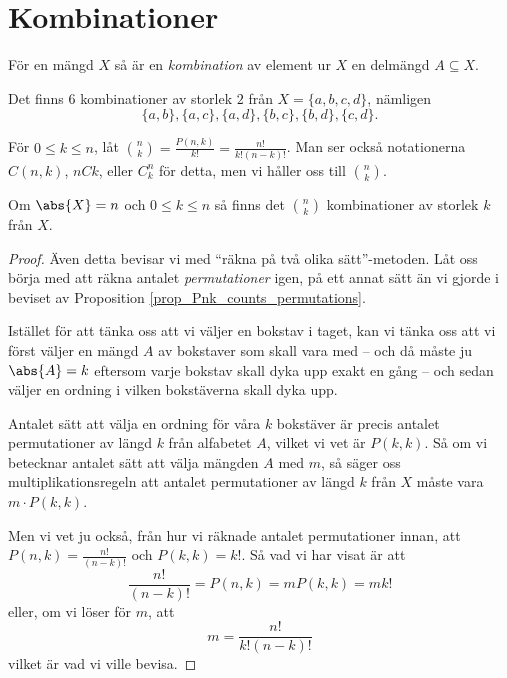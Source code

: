 \documentclass{tufte-handout}
\begin{document}
\section{Kombinationer}

\begin{definition}
	För en mängd $X$ så är en \emph{kombination} av element ur $X$ en delmängd $A \subseteq X$.
\end{definition}

\begin{example}
	Det finns $6$ kombinationer av storlek $2$ från $X = \{a,b,c,d\}$, nämligen
	$$\{a,b\}, \{a,c\},\{a,d\},\{b,c\},\{b,d\},\{c,d\}.$$
\end{example}

\begin{definition}
	För $0 \leq k \leq n$, låt $\binom{n}{k} = \frac{P(n,k)}{k!} = \frac{n!}{k!(n-k)!}$. Man ser också notationerna $C(n,k)$, $nCk$, eller $C^n_k$ för detta, men vi håller oss till $\binom{n}{k}$. 
\end{definition}

\begin{proposition}
	Om $\abs{X} = n$ och $0 \leq k \leq n$ så finns det $\binom{n}{k}$ kombinationer av storlek $k$ från $X$.
	\begin{proof}
		Även detta bevisar vi med ``räkna på två olika sätt''-metoden. Låt oss börja med att räkna antalet \emph{permutationer} igen, på ett annat sätt än vi gjorde i beviset av Proposition \ref{prop_Pnk_counts_permutations}.

		Istället för att tänka oss att vi väljer en bokstav i taget, kan vi tänka oss att vi först väljer en mängd $A$ av bokstaver som skall vara med -- och då måste ju $\abs{A} = k$ eftersom varje bokstav skall dyka upp exakt en gång -- och sedan väljer en ordning i vilken bokstäverna skall dyka upp.

		Antalet sätt att välja en ordning för våra $k$ bokstäver är precis antalet permutationer av längd $k$ från alfabetet $A$, vilket vi vet är $P(k,k)$. Så om vi betecknar antalet sätt att välja mängden $A$ med $m$, så säger oss multiplikationsregeln att antalet permutationer av längd $k$ från $X$ måste vara $m\cdot P(k,k)$.

		Men vi vet ju också, från hur vi räknade antalet permutationer innan, att $P(n,k) = \frac{n!}{(n-k)!}$ och $P(k,k) = k!$. Så vad vi har visat är att
		$$\frac{n!}{(n-k)!} = P(n,k) = m P(k,k) = m k!$$
		eller, om vi löser för $m$, att
		$$m = \frac{n!}{k!(n-k)!}$$
		vilket är vad vi ville bevisa.
	\end{proof}
\end{proposition}
\end{document}

